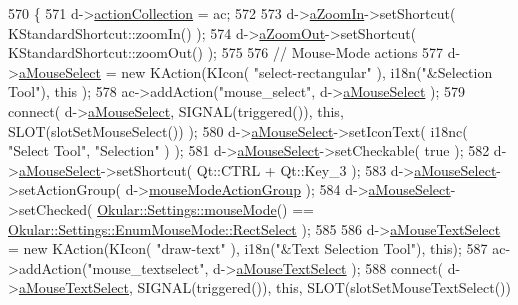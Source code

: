 \begin{DoxyCode}
570 \{
571     d->\hyperlink{classPageViewPrivate_a6abf868c8b0713a89291d48eef79d193}{actionCollection} = ac;
572 
573     d->\hyperlink{classPageViewPrivate_a07171f9e585da785aba41e84bf6014fb}{aZoomIn}->setShortcut( KStandardShortcut::zoomIn() );
574     d->\hyperlink{classPageViewPrivate_a193ef99e27c1d7c1b1741e33ada152ec}{aZoomOut}->setShortcut( KStandardShortcut::zoomOut() );
575 
576     \textcolor{comment}{// Mouse-Mode actions}
577     d->\hyperlink{classPageViewPrivate_a9e809032b95484f491dd439198b7bb8e}{aMouseSelect}  = \textcolor{keyword}{new} KAction(KIcon( \textcolor{stringliteral}{"select-rectangular"} ), i18n(\textcolor{stringliteral}{"&Selection Tool"}), \textcolor{keyword}{this}
      );
578     ac->addAction(\textcolor{stringliteral}{"mouse\_select"}, d->\hyperlink{classPageViewPrivate_a9e809032b95484f491dd439198b7bb8e}{aMouseSelect} );
579     connect( d->\hyperlink{classPageViewPrivate_a9e809032b95484f491dd439198b7bb8e}{aMouseSelect}, SIGNAL(triggered()), \textcolor{keyword}{this}, SLOT(slotSetMouseSelect()) );
580     d->\hyperlink{classPageViewPrivate_a9e809032b95484f491dd439198b7bb8e}{aMouseSelect}->setIconText( i18nc( \textcolor{stringliteral}{"Select Tool"}, \textcolor{stringliteral}{"Selection"} ) );
581     d->\hyperlink{classPageViewPrivate_a9e809032b95484f491dd439198b7bb8e}{aMouseSelect}->setCheckable( \textcolor{keyword}{true} );
582     d->\hyperlink{classPageViewPrivate_a9e809032b95484f491dd439198b7bb8e}{aMouseSelect}->setShortcut( Qt::CTRL + Qt::Key\_3 );
583     d->\hyperlink{classPageViewPrivate_a9e809032b95484f491dd439198b7bb8e}{aMouseSelect}->setActionGroup( d->\hyperlink{classPageViewPrivate_ae7b75854286f78f9b871f99bebb1eb73}{mouseModeActionGroup} );
584     d->\hyperlink{classPageViewPrivate_a9e809032b95484f491dd439198b7bb8e}{aMouseSelect}->setChecked( \hyperlink{classOkular_1_1Settings_af8e39e25e841b413d67af2cb4dfc0688}{Okular::Settings::mouseMode}() == 
      \hyperlink{classOkular_1_1Settings_1_1EnumMouseMode_ab2ae04e2d7d069f02195ccf32c52415baa9bf3100d0e93abfec2769957743e6a2}{Okular::Settings::EnumMouseMode::RectSelect} );
585 
586     d->\hyperlink{classPageViewPrivate_a1d8b1716abeb281e68dce858ffda489f}{aMouseTextSelect}  = \textcolor{keyword}{new} KAction(KIcon( \textcolor{stringliteral}{"draw-text"} ), i18n(\textcolor{stringliteral}{"&Text Selection Tool"}), \textcolor{keyword}{
      this});
587     ac->addAction(\textcolor{stringliteral}{"mouse\_textselect"}, d->\hyperlink{classPageViewPrivate_a1d8b1716abeb281e68dce858ffda489f}{aMouseTextSelect} );
588     connect( d->\hyperlink{classPageViewPrivate_a1d8b1716abeb281e68dce858ffda489f}{aMouseTextSelect}, SIGNAL(triggered()), \textcolor{keyword}{this}, SLOT(slotSetMouseTextSelect())

\end{DoxyCode}
